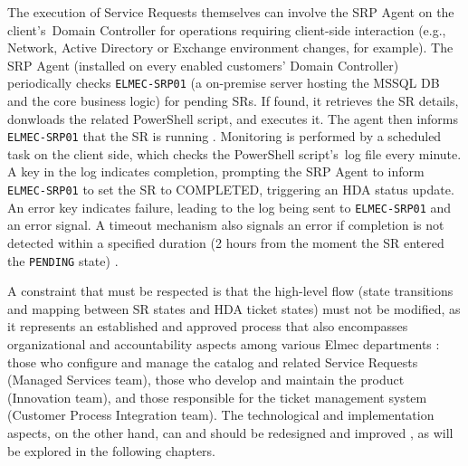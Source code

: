 The execution of Service Requests themselves can involve the SRP Agent on the client's~Domain Controller for operations requiring client-side interaction (e.g., Network, Active Directory or Exchange environment changes, for example). The SRP Agent (installed on every enabled customers' Domain Controller) periodically checks \texttt{ELMEC-SRP01} (a on-premise server hosting the MSSQL DB and the core business logic) for pending SRs. If found, it retrieves the SR details, donwloads the related PowerShell script, and executes it. The agent then informs \texttt{ELMEC-SRP01} that the SR is running \cite{srp_windowsservice_git}. Monitoring is performed by a scheduled task on the client side, which checks the PowerShell script's~log file every minute. A key in the log indicates completion, prompting the SRP Agent to inform \texttt{ELMEC-SRP01} to set the SR to COMPLETED, triggering an HDA status update. An error key indicates failure, leading to the log being sent to \texttt{ELMEC-SRP01} and an error signal. A timeout mechanism also signals an error if completion is not detected within a specified duration (2 hours from the moment the SR entered the \texttt{PENDING} state) \cite{srp_windowsservice_git}.

A constraint that must be respected is that the high-level flow (state transitions and mapping between SR states and HDA ticket states) must not be modified, as it represents an established and approved process that also encompasses organizational and accountability aspects among various Elmec departments \cite{requirements_meeting}: those who configure and manage the catalog and related Service Requests (Managed Services team), those who develop and maintain the product (Innovation team), and those responsible for the ticket management system (Customer Process Integration team).
The technological and implementation aspects, on the other hand, can and should be redesigned and improved \cite{requirements_meeting}, as will be explored in the following chapters.
